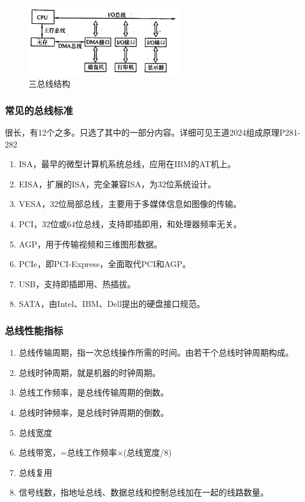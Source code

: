 \documentclass[12pt, a4paper, oneside]{ctexart}
\begin{document}
\begin{figure}
  \centering
  \includegraphics[width=0.6\textwidth]{./images/triple-bus-structure.png}
  \caption{三总线结构}
  \label{triple-bus-structure}
\end{figure}

\subsubsection{常见的总线标准}

很长，有12个之多。只选了其中的一部分内容。详细可见王道2024组成原理P281-282

\begin{enumerate}
  \item ISA，最早的微型计算机系统总线，应用在IBM的AT机上。
  \item EISA，扩展的ISA，完全兼容ISA，为32位系统设计。
  \item VESA，32位局部总线，主要用于多媒体信息如图像的传输。
  \item PCI，32位或64位总线，支持即插即用，和处理器频率无关。
  \item AGP，用于传输视频和三维图形数据。
  \item PCIe，即PCI-Express，全面取代PCI和AGP。
  \item USB，支持即插即用、热插拔。
  \item SATA，由Intel、IBM、Dell提出的硬盘接口规范。
\end{enumerate}

\subsubsection{总线性能指标}

\begin{enumerate}
  \item 总线传输周期，指一次总线操作所需的时间。由若干个总线时钟周期构成。
  \item 总线时钟周期，就是机器的时钟周期。
  \item 总线工作频率，是总线传输周期的倒数。
  \item 总线时钟频率，是总线时钟周期的倒数。
  \item 总线宽度
  \item 总线带宽，=总线工作频率$\times$(总线宽度/8)
  \item 总线复用
  \item 信号线数，指地址总线、数据总线和控制总线加在一起的线路数量。
\end{enumerate}
\end{document}
